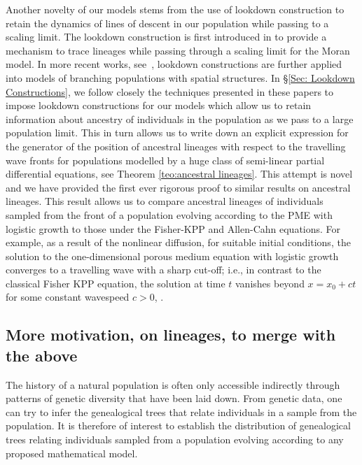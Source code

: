 \documentclass[12pt]{article}
\begin{document}
Another novelty of our models stems from the use of lookdown construction to retain the dynamics of lines of descent in our population while passing to a scaling limit. The lookdown construction is first introduced in \cite{donnelly/kurtz:1996} to provide a mechanism to trace lineages while passing through a scaling limit for the Moran model. In more recent works, see~\cite{kurtz/rodrigues:2011, etheridge/kurtz:2018}, lookdown constructions are further applied into models of branching populations with spatial structures. In \S \ref{Sec: Lookdown Constructions}, we follow closely the techniques presented in these papers to impose lookdown constructions for our models which allow us to retain information about ancestry of individuals in the population as we pass to a large population limit. This in turn allows us to write down an explicit expression for the generator of the position of ancestral lineages with respect to the travelling wave fronts for populations modelled by a huge class of semi-linear partial differential equations, see Theorem \ref{teo:ancestral lineages}.
This attempt is novel and we have provided the first ever rigorous proof to similar results on ancestral lineages. This result allows us to compare ancestral lineages of individuals sampled from the front of a population evolving according to the PME with logistic growth to those under the Fisher-KPP and Allen-Cahn equations. For example, as a result of the nonlinear diffusion, 
for suitable initial conditions, the solution to the one-dimensional 
porous medium equation with logistic growth converges to a travelling
wave with a sharp cut-off; i.e., in contrast to the classical 
Fisher KPP equation, the solution at time $t$
vanishes beyond $x=x_0+ct$ for some constant wavespeed
$c>0$, \cite{kamin/rosenau:2004}.

\subsection{More motivation, on lineages, to merge with the above}

The history of a natural population is often only accessible indirectly 
through patterns of genetic diversity that have been laid down. From 
genetic data, one can try to infer the genealogical trees that relate 
individuals in a sample from the population. It is therefore of interest
to establish the distribution of genealogical trees relating individuals
sampled from a population evolving according to any proposed mathematical
model.
\end{document}
